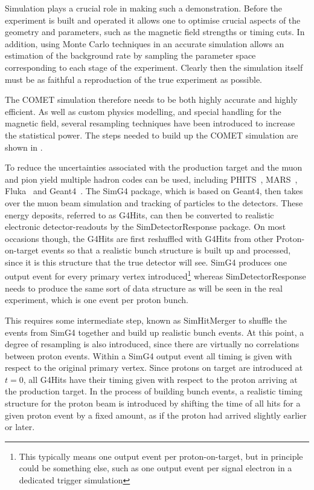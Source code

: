 Simulation plays a crucial role in making such a demonstration. 
Before the experiment is built and operated it allows one to optimise crucial aspects of the geometry and parameters, such as the magnetic field strengths or timing cuts.
In addition, using Monte Carlo techniques in an accurate simulation allows an estimation of the background rate by sampling the parameter space corresponding to each stage of the experiment.
Clearly then the simulation itself must be as faithful a reproduction of the true experiment as possible.
\FigSimulationOverview

The COMET simulation therefore needs to be both highly accurate and highly efficient.
As well as custom physics modelling, and special handling for the magnetic field, several resampling techniques have been introduced to increase the statistical power.
The steps needed to build up the COMET simulation are shown in .

To reduce the uncertainties associated with the production target and the muon and pion yield multiple hadron codes can be used, including PHITS~\cite{PHITS2002}, MARS~\cite{MARS1995}, Fluka~\cite{FLUKA2005} and Geant4~\cite{Geant42003}.
The SimG4 package, which is based on Geant4, then takes over the muon beam simulation and tracking of particles to the detectors.
These energy deposits, referred to as G4Hits, can then be converted to realistic electronic detector-readouts by the SimDetectorResponse package.
On most occasions though, the G4Hits are first reshuffled with G4Hits from other Proton-on-target events so that a realistic bunch structure is built up and processed, since it is this structure that the true detector will see.
SimG4 produces one output event for every primary vertex introduced\footnote{This typically means one output event per proton-on-target, but in principle could be something else, such as one output event per signal electron in a dedicated trigger simulation} %
whereas SimDetectorResponse needs to produce the same sort of data structure as will be seen in the real experiment, which is one event per proton bunch.

This requires some intermediate step, known as SimHitMerger to shuffle the events from SimG4 together and build up realistic bunch events.
At this point, a degree of resampling is also introduced, since there are virtually no correlations between proton events.
Within a SimG4 output event all timing is given with respect to the original primary vertex.  
Since protons on target are introduced at $t=0$, all G4Hits have their timing given with respect to the proton arriving at the production target.
In the process of building bunch events, a realistic timing structure for the proton beam is introduced by shifting the time of all hits for a given proton event by a fixed amount, as if the proton had arrived slightly earlier or later.

